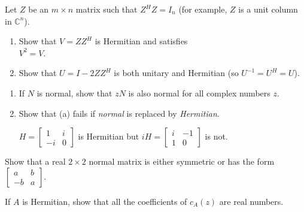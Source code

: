 \documentclass{ximera}
\begin{document}
\begin{problem}\label{prb:complex_matrices17}
Let $Z$ be an $m \times n$ matrix such that $Z^{H}Z = I_{n}$ (for example, $Z$ is a unit column in $\mathbb{C}^n$).

\begin{enumerate}
\item Show that $V = ZZ^{H}$ is Hermitian and satisfies \\ $V^{2} = V$.

\item Show that $U = I - 2ZZ^{H}$ is both unitary and Hermitian (so $U^{-1} = U^{H} = U$).

\end{enumerate}
\end{problem}

\begin{problem}\label{prb:complex_matrices18}
\begin{enumerate}
\item If $N$ is normal, show that $zN$ is also normal for all complex numbers $z$.

\item Show that (a) fails if \textit{normal} is replaced by \textit{Hermitian}.
\begin{hint}
$H = \left[ \begin{array}{rr}
1 & i \\
-i & 0
\end{array}\right]$ is Hermitian but $iH = \left[ \begin{array}{rr}
i & -1 \\
1 & 0
\end{array}\right]$ is not.
\end{hint}
\end{enumerate}
\end{problem}

\begin{problem}\label{prb:complex_matrices19}
Show that a real $2 \times 2$ normal matrix is either symmetric or has the form $\left[ \begin{array}{rr}
a & b \\
-b & a
\end{array}\right]$.
\end{problem}

\begin{problem}\label{prb:complex_matrices20}
If $A$ is Hermitian, show that all the coefficients of $c_{A}(z)$ are real numbers.
\end{problem}
\end{document}
